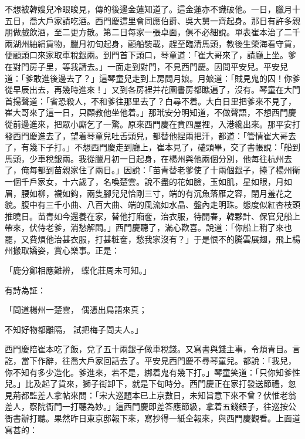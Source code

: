 \begin{showcontents}{}
不想被韓嫂兒冷眼睃見，傳的後邊金蓮知道了。這金蓮亦不識破他。一日，臘月十五日，喬大戶家請吃酒。西門慶這里會同應伯爵、吳大舅一齊起身。那日有許多親朋做戲飲酒，至二更方散。第二日每家一張卓面，俱不必細說。單表崔本治了二千兩湖州紬絹貨物，臘月初旬起身，顧船裝載，趕至臨清馬頭，教後生榮海看守貨，便顧頭口來家取車稅銀兩。到門首下頭口，琴童道：「崔大哥來了，請廳上坐。爹在對門房子里，等我請去。」一面走到對門，不見西門慶。因問平安兒。平安兒道：「爹敢進後邊去了？」這琴童兒走到上房問月娘。月娘道：「賊見鬼的囚！你爹從早辰出去，再幾時進來！」又到各房裡并花園書房都瞧遍了，沒有。琴童在大門首揚聲道：「省恐殺人，不和爹往那里去了？白尋不着。大白日里把爹來不見了，崔大哥來了這一日，只顧教他坐他着。」那玳安分明知道，不做聲語，不想西門慶從前邊進來，把眾小廝乞了一驚。原來西門慶在賁四屋裡，入港纔出來。那平安打發西門慶進去了，望着琴童兒吐舌頭兒，都替他捏兩把汗，都道：「管情崔大哥去了，有幾下子打。」不想西門慶走到廳上，崔本見了，磕頭畢，交了書帳說：「船到馬頭，少車稅銀兩。我從臘月初一日起身，在楊州與他兩個分別，他每往杭州去了，俺每都到苗親家住了兩日。」因說：「苗青替老爹使了十兩個銀子，擡了楊州衛一個千戶家女，十六歲了，名喚楚雲。說不盡的花如臉，玉如肌，星如眼，月如眉，腰如柳，襪如鈎，兩隻腳兒兒恰剛三寸，端的有沉魚落雁之容，閉月羞花之貌。腹中有三千小曲、八百大曲、端的風流如水晶、盤內走明珠。態度似紅杏枝頭推曉日。苗青如今還養在家，替他打廂奩，治衣服，待開春，韓夥計、保官兒船上帶來，伏侍老爹，消愁解悶。」西門慶聽了，滿心歡喜。說道：「你船上稍了來也罷，又費煩他治甚衣服，打甚粧奩，愁我家沒有？」于是恨不的騰雲展翅，飛上楊州搬取嬌姿，賞心樂事。正是：

「鹿分鄭相應難辨，  蝶化莊周未可知。」

有詩為証：

「問道楊州一楚雲，  偶憑出鳥語來真；

不知好物都離隔，  試把梅子問夫人。」

西門慶陪崔本吃了飯，兌了五十兩銀子做車稅錢。又寫書與錢主事，令煩青目。言訖，當下作辭，往喬大戶家回話去了。平安見西門慶不尋琴童兒。都說：「我兒，你不知有多少造化。爹進來，若不是，綁着鬼有幾下打。」琴童笑道：「只你知爹性兒。」比及起了貨來，獅子街卸下，就是下旬時分。西門慶正在家打發送節禮，忽見荊都監差人拿帖來問：「宋大巡題本已上京數日，未知旨意下來不曾？伏惟老翁差人，察院衙門一打聽為妙。」這西門慶即差答應節級，拿着五錢銀子，往巡按公衙書辦打聽。果然昨日東京邸報下來，寫抄得一紙全報來，與西門慶觀看。上面道寫甚的：


\end{showcontents}
